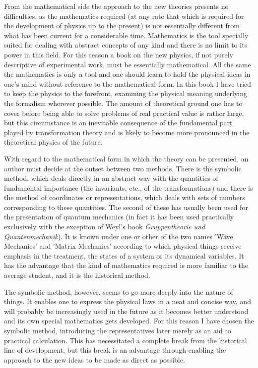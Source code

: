 From the mathematical side the approach to the new theories presents no difficulties, as the mathematics required (at any rate that which is required for the development of physics up to the present) is not essentially different from what has been current for a considerable time.  Mathematics is the tool specially suited for dealing with abstract concepts of any kind and there is no limit to its power in this field.  For this reason a book on the new physics, if not purely descriptive of experimental work, must be essentially mathematical.  All the same the mathematics is only a tool and one should learn to hold the physical ideas in one's mind without reference to the mathematical form.  In this book I have tried to keep the physics to the forefront, examining the physical meaning underlying the formalism wherever possible.  The amount of theoretical ground one has to cover before being able to solve problems of real practical value is rather large, but this circumstance is an inevitable consequence of the fundamental part played by transformation theory and is likely to become more pronounced in the theoretical physics of the future.

With regard to the mathematical form in which the theory can be presented, an author must decide at the outset between two methods.  There is the symbolic method, which deals directly in an abstract way with the quantities of fundamental importance (the invariants, etc., of the transformations) and there is the method of coordinates or representations, which deals with sets of numbers corresponding to these quantities.  The second of these has usually been used for the presentation of quantum mechanics (in fact it has been used practically exclusively with the exception of Weyl's book \emph{Gruppentheorie und Quantenmechanik}).  It is known under one or other of the two names 'Wave Mechanics' and 'Matrix Mechanics' according to which physical things receive emphasis in the treatment, the states of a system or its dynamical variables.  It has the advantage that the kind of mathematics required is more familiar to the average student, and it is the historical method.

The symbolic method, however, seems to go more deeply into the nature of things.  It enables one to express the physical laws in a neat and concise way, and will probably be increasingly used in the future as it becomes better understood and its own special mathematics gets developed.  For this reason I have chosen the symbolic method, introducing the representatives later merely as an aid to practical calculation.  This has necessitated a complete break from the historical line of development, but this break is an advantage through enabling the approach to the new ideas to be made as direct as possible. \vspace{5mm}

